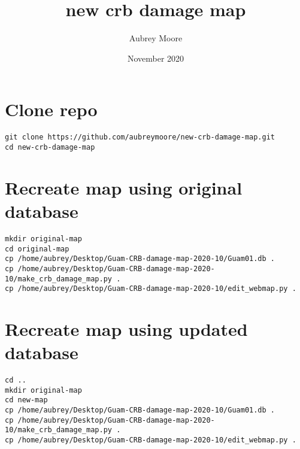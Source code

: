\documentclass{scrartcl}
\title{new crb damage map}
\author{Aubrey Moore}
\date{November 2020}
\begin{document}
\maketitle

\section{Clone repo}
\begin{verbatim}
git clone https://github.com/aubreymoore/new-crb-damage-map.git
cd new-crb-damage-map
\end{verbatim}

\section{Recreate map using original database}

\begin{verbatim}
mkdir original-map
cd original-map
cp /home/aubrey/Desktop/Guam-CRB-damage-map-2020-10/Guam01.db .
cp /home/aubrey/Desktop/Guam-CRB-damage-map-2020-10/make_crb_damage_map.py .
cp /home/aubrey/Desktop/Guam-CRB-damage-map-2020-10/edit_webmap.py .
\end{verbatim}

\section{Recreate map using updated database}
\begin{verbatim}
cd ..
mkdir original-map
cd new-map
cp /home/aubrey/Desktop/Guam-CRB-damage-map-2020-10/Guam01.db .
cp /home/aubrey/Desktop/Guam-CRB-damage-map-2020-10/make_crb_damage_map.py .
cp /home/aubrey/Desktop/Guam-CRB-damage-map-2020-10/edit_webmap.py .
\end{verbatim}
\end{document}
